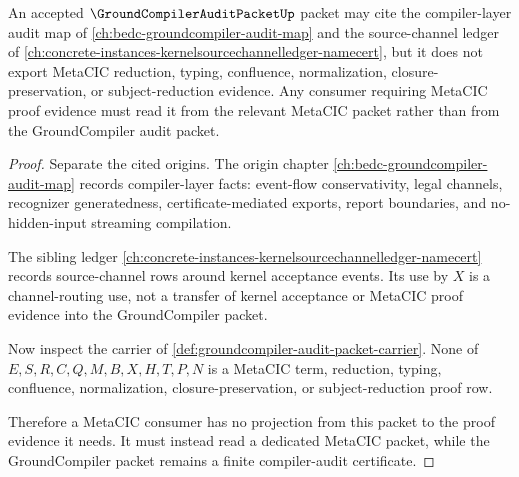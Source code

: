 \begin{theorem}
\label{thm:groundcompiler-audit-packet-metacic-separation}
An accepted $\GroundCompilerAuditPacketUp$ packet may cite the compiler-layer audit map of \autoref{ch:bedc-groundcompiler-audit-map} and the source-channel ledger of \autoref{ch:concrete-instances-kernelsourcechannelledger-namecert}, but it does not export MetaCIC reduction, typing, confluence, normalization, closure-preservation, or subject-reduction evidence. Any consumer requiring MetaCIC proof evidence must read it from the relevant MetaCIC packet rather than from the GroundCompiler audit packet.
\end{theorem}
\begin{proof}
Separate the cited origins. The origin chapter \autoref{ch:bedc-groundcompiler-audit-map} records compiler-layer facts: event-flow conservativity, legal channels, recognizer generatedness, certificate-mediated exports, report boundaries, and no-hidden-input streaming compilation.

The sibling ledger \autoref{ch:concrete-instances-kernelsourcechannelledger-namecert} records source-channel rows around kernel acceptance events. Its use by $X$ is a channel-routing use, not a transfer of kernel acceptance or MetaCIC proof evidence into the GroundCompiler packet.

Now inspect the carrier of \autoref{def:groundcompiler-audit-packet-carrier}. None of $E,S,R,C,Q,M,B,X,H,T,P,N$ is a MetaCIC term, reduction, typing, confluence, normalization, closure-preservation, or subject-reduction proof row.

Therefore a MetaCIC consumer has no projection from this packet to the proof evidence it needs. It must instead read a dedicated MetaCIC packet, while the GroundCompiler packet remains a finite compiler-audit certificate.
\end{proof}

